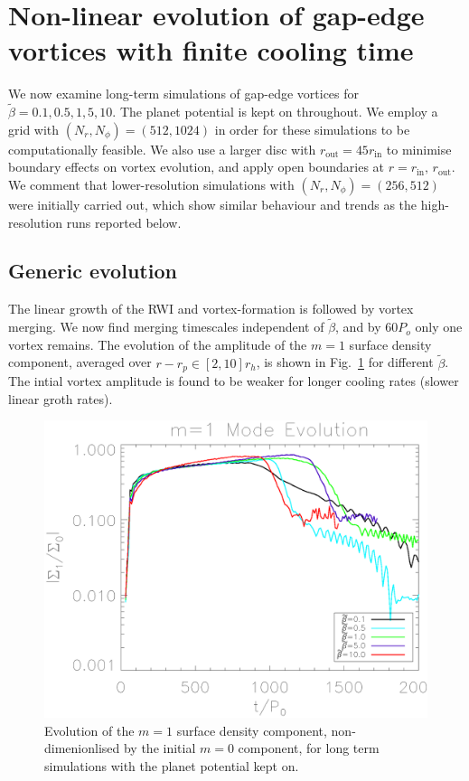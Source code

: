 
\section{Non-linear evolution of
  gap-edge vortices with finite cooling time}\label{nonlinear} 
We now examine long-term simulations of gap-edge vortices for
$\tilde{\beta}=0.1,0.5,1,5,10$. The planet potential is kept on
throughout. We employ a grid with $(N_r,N_{\phi})=(512,1024)$ in order
for these 
simulations to be computationally feasible. We also use a larger
disc with $r_{\mathrm{out}}=45r_{\mathrm{in}}$ to minimise boundary
effects on vortex evolution, and apply open boundaries at
$r=r_\mathrm{in},\,r_\mathrm{out}$. We comment that lower-resolution
simulations with $(N_r,N_{\phi})=(256,512)$ were initially carried
out, which show similar behaviour and trends as the high-resolution
runs reported below.   

\subsection{Generic evolution} 
The linear growth of the RWI and vortex-formation is followed by 
vortex merging. We now find merging timescales independent of
$\tilde\beta$, and by $60P_o$ only one vortex remains. 
The evolution of the amplitude of the $m=1$ surface density component,
averaged over $r-r_p\in[2,10]r_h$, is shown in Fig.~\ref{lifetimeplot} 
for different $\tilde\beta$. The intial vortex amplitude is found to
be weaker for longer cooling rates (slower linear groth rates).

\begin{figure}
  \includegraphics[width=\linewidth,clip=true,trim=0.5cm
  0cm 0cm 1cm]{figures/longterm_stability}
  \caption{Evolution of the $m=1$ surface density component,
    non-dimenionlised by the initial $m=0$ component, for long term
    simulations with the planet potential kept on.\label{lifetimeplot}}   
\end{figure}

